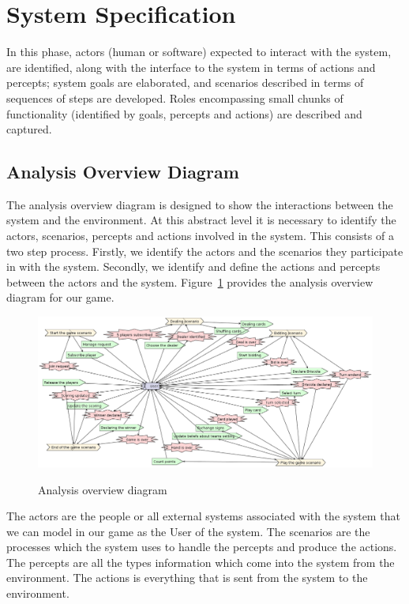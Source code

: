 \documentclass[a4paper]{article}
\begin{document}
\section{System Specification}\label{sec:sysspec} 

In this phase, actors (human or software) expected to interact with the system, are identified, along with the interface to the system in terms of actions and percepts; system goals are elaborated, and scenarios described in terms of sequences of steps are developed. Roles encompassing small chunks of functionality (identified by goals, percepts and actions) are described and captured.

\subsection{Analysis Overview Diagram}

The analysis overview diagram is designed to show the interactions between the system and the environment. At this abstract level it is necessary to identify the actors, scenarios, percepts and actions involved in the system. This consists of a two step process. Firstly, we identify the actors and the scenarios they participate in with the system. Secondly, we identify and define the actions and percepts between the actors and the system. Figure~\ref{fig:analysis} provides the analysis overview diagram for our game.

\begin{figure}[htp]
  \includegraphics[keepaspectratio,scale=0.35]{pdt/images/system_specification/analysis_overview.png}
  \label{fig:analysis}
  \caption{Analysis overview diagram}
\end{figure}

The actors are the people or all external systems associated with the system that  we can model in our game as the User of the system. The scenarios are the processes which the system uses to handle the percepts and produce the actions. The percepts are all the types information which come into the system from the environment. The actions is everything that is sent from the system to the environment.
\end{document}
